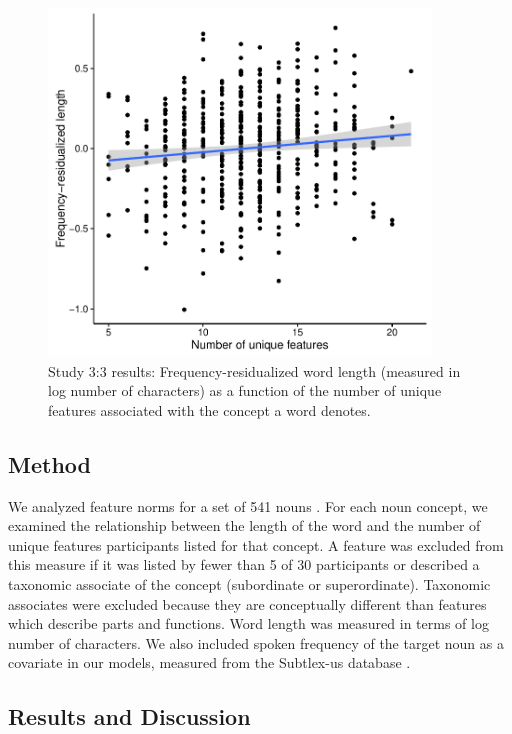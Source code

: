   \begin{figure}[t!]
 \begin{center}
  \includegraphics[width=4in]{figs/feature_plot.pdf}
  \caption{\label{fig:feature_plot} Study 3:3 results: Frequency-residualized word length (measured in log number of characters) as a function of the number of unique features associated with the concept a word denotes. }
 \end{center}
\end{figure}

\subsection{Method}
We analyzed feature norms for a set of 541 nouns \cite{mcrae2005semantic}. For each noun concept, we examined the relationship between the length of the word and the number of unique features participants listed for that concept. A feature was excluded from this measure if it was listed by fewer than 5 of 30 participants or described a taxonomic associate of the concept (subordinate or superordinate). Taxonomic associates were excluded because they are conceptually different than features which describe parts and functions. Word length was measured in terms of log number of characters. We also included spoken frequency of the target noun as a covariate in our models, measured from the Subtlex-us database \cite{brysbaert2009moving}. 

\subsection{Results and Discussion}

